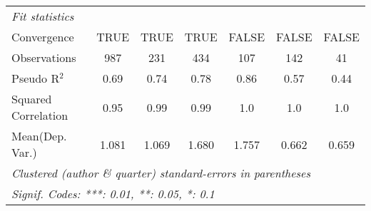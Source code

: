 \begin{tabular}{lcccccc}
   \midrule
   \emph{Fit statistics}\\
   Convergence                                                &TRUE           & TRUE      & TRUE         & FALSE        & FALSE         & FALSE\\  
   Observations                                               & 987           & 231       & 434          & 107          & 142           & 41\\  
   Pseudo R$^2$                                               & 0.69          & 0.74      & 0.78         & 0.86         & 0.57          & 0.44\\  
   Squared Correlation                                        & 0.95          & 0.99      & 0.99         & 1.0          & 1.0           & 1.0\\  
Mean(Dep. Var.) & 1.081 & 1.069 & 1.680 & 1.757 & 0.662 & 0.659 \\
   \midrule \midrule
   \multicolumn{7}{l}{\emph{Clustered (author \& quarter) standard-errors in parentheses}}\\
   \multicolumn{7}{l}{\emph{Signif. Codes: ***: 0.01, **: 0.05, *: 0.1}}\\
\end{tabular}
\par\endgroup
